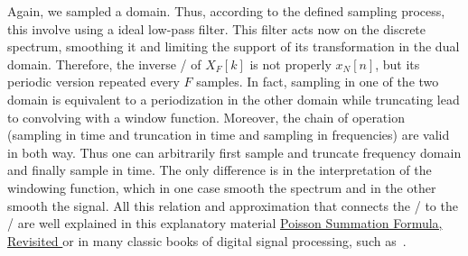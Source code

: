 \mynewline
Again, we sampled a domain. Thus, according to the defined sampling process, this involve using a ideal low-pass filter.
This filter acts now on the discrete spectrum, smoothing it and limiting the support of its transformation in the dual domain.
Therefore, the inverse \DFT/ of $X_F[k]$ is not properly $x_N[n]$, but its periodic version repeated every $F$ samples.
In fact, sampling in one of the two domain is equivalent to a periodization in the other domain while truncating lead to convolving with a window function.
Moreover, the chain of operation (sampling in time and truncation in time and sampling in frequencies) are valid in both way.
Thus one can arbitrarily first sample and truncate frequency domain and finally sample in time.
The only difference is in the interpretation of the windowing function, which in one case smooth the spectrum and in the other smooth the signal.
All this relation and approximation that connects the \FT/ to the \DFT/ are well explained in this explanatory material
{\href{https://krasjet.com/rnd.wlk/poisson.pdf}{Poisson Summation Formula, Revisited \ExternalLink}} or in many classic books of digital signal processing, such as~.


